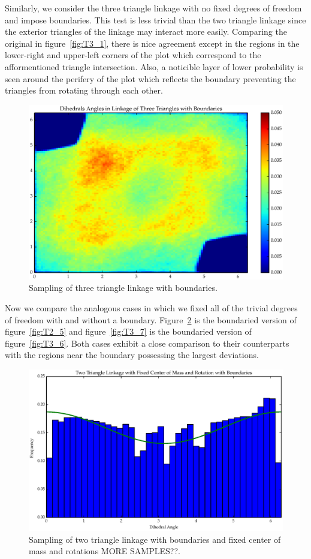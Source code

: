 Similarly, we consider the three triangle linkage with no fixed degrees of freedom and impose boundaries. This test is less trivial than the two triangle linkage since the exterior triangles of the linkage may interact more easily. Comparing the original in figure~\ref{fig:T3_1}, there is nice agreement except in the regions in the lower-right and upper-left corners of the plot which correspond to the afformentioned triangle intersection. Also, a noticible layer of lower probability is seen around the perifery of the plot which reflects the boundary preventing the triangles from rotating through each other.
\begin{figure}[ht]
\label{fig:T3_2}
\centering
  \includegraphics[scale=0.6]{images/T3_2_2D.eps}
\caption{Sampling of three triangle linkage with boundaries.}
\end{figure}

Now we compare the analogous cases in which we fixed all of the trivial degrees of freedom with and without a boundary. Figure~\ref{fig:T2_6} is the boundaried version of figure~\ref{fig:T2_5} and figure~\ref{fig:T3_7} is the boundaried version of figure~\ref{fig:T3_6}. Both cases exhibit a close comparison to their counterparts with the regions near the boundary possessing the largest deviations. 
\begin{figure}[ht]
\label{fig:T2_6}
\centering
  \includegraphics[scale=0.6]{images/T2_6.eps}
\caption{Sampling of two triangle linkage with boundaries and fixed center of mass and rotations MORE SAMPLES??.}
\end{figure}

